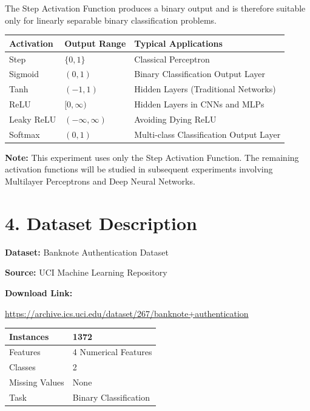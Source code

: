 \documentclass[11pt]{article}
\begin{document}
The Step Activation Function produces a binary output and is therefore suitable only for linearly separable binary classification problems.

\begin{center}
\begin{tabular}{|p{2.5cm}|p{3cm}|p{6cm}|}
\hline
\textbf{Activation} & \textbf{Output Range} & \textbf{Typical Applications}\\
\hline
Step & $\{0,1\}$ & Classical Perceptron\\
\hline
Sigmoid & $(0,1)$ & Binary Classification Output Layer\\
\hline
Tanh & $(-1,1)$ & Hidden Layers (Traditional Networks)\\
\hline
ReLU & $[0,\infty)$ & Hidden Layers in CNNs and MLPs\\
\hline
Leaky ReLU & $(-\infty,\infty)$ & Avoiding Dying ReLU\\
\hline
Softmax & $(0,1)$ & Multi-class Classification Output Layer\\
\hline
\end{tabular}
\end{center}

\textbf{Note:} This experiment uses only the Step Activation Function. The remaining activation functions will be studied in subsequent experiments involving Multilayer Perceptrons and Deep Neural Networks.


\section*{4. Dataset Description}

\textbf{Dataset:} Banknote Authentication Dataset

\textbf{Source:} UCI Machine Learning Repository

\textbf{Download Link:}

\url{https://archive.ics.uci.edu/dataset/267/banknote+authentication}

\begin{center}
\begin{tabular}{|l|l|}
\hline
Instances & 1372\\
\hline
Features & 4 Numerical Features\\
\hline
Classes & 2\\
\hline
Missing Values & None\\
\hline
Task & Binary Classification\\
\hline
\end{tabular}
\end{center}
\end{document}
